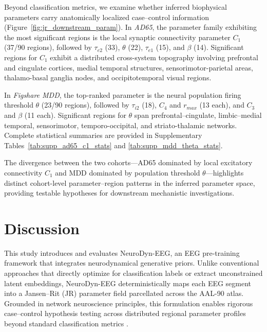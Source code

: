 \documentclass{article}
\begin{document}
{Beyond classification metrics, we examine whether inferred biophysical parameters carry anatomically localized case--control information (Figure~\ref{fig:jr_downstream_param}). In \textit{AD65}, the parameter family exhibiting the most significant regions is the local synaptic connectivity parameter \texttt{$C_1$} (37/90 regions), followed by \texttt{$\tau_{e2}$} (33), \texttt{$\theta$} (22), \texttt{$\tau_{e1}$} (15), and \texttt{$\beta$} (14). Significant regions for \texttt{$C_1$} exhibit a distributed cross-system topography involving prefrontal and cingulate cortices, medial temporal structures, sensorimotor-parietal areas, thalamo-basal ganglia nodes, and occipitotemporal visual regions.

In \textit{Figshare MDD}, the top-ranked parameter is the neural population firing threshold \texttt{$\theta$} (23/90 regions), followed by \texttt{$\tau_{i2}$} (18), \texttt{$C_4$} and \texttt{$r_{max}$} (13 each), and \texttt{$C_3$} and \texttt{$\beta$} (11 each). Significant regions for \texttt{$\theta$} span prefrontal--cingulate, limbic--medial temporal, sensorimotor, temporo-occipital, and striato-thalamic networks. Complete statistical summaries are provided in Supplementary Tables~\ref{tab:supp_ad65_c1_stats} and \ref{tab:supp_mdd_theta_stats}.

The divergence between the two cohorts---AD65 dominated by local excitatory connectivity \texttt{$C_1$} and MDD dominated by population threshold \texttt{$\theta$}---highlights distinct cohort-level parameter–region patterns in the inferred parameter space, providing testable hypotheses for downstream mechanistic investigations.

\section{Discussion}
This study introduces and evaluates NeuroDyn-EEG, an EEG pre-training framework that integrates neurodynamical generative priors. Unlike conventional approaches that directly optimize for classification labels or extract unconstrained latent embeddings, NeuroDyn-EEG deterministically maps each EEG segment into a Jansen--Rit (JR) parameter field parcellated across the AAL-90 atlas. Grounded in network neuroscience principles, this formulation enables rigorous case--control hypothesis testing across distributed regional parameter profiles beyond standard classification metrics \citep{bassett2017network,fornito2015connectomics}.

}
\end{document}
